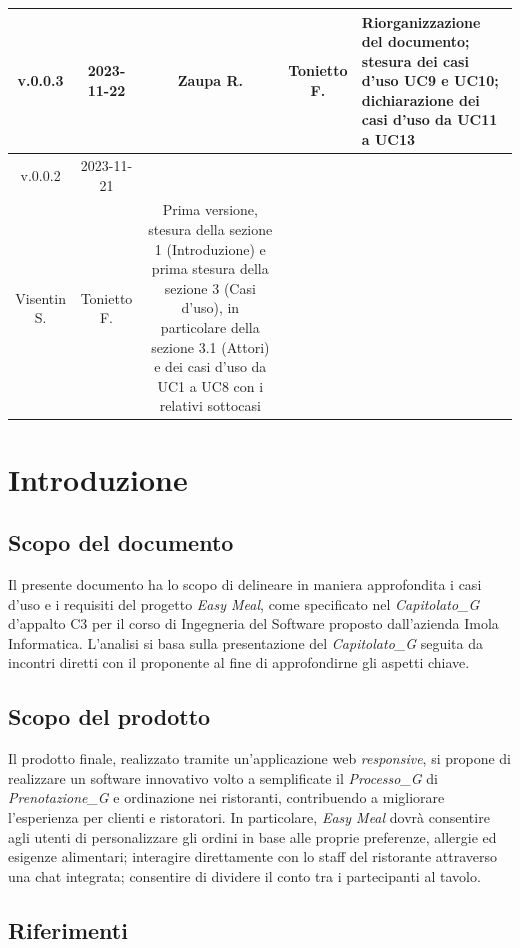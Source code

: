 \documentclass[12pt, oneside]{article}
\begin{document}
\begin{longtable}{|c|c|c|c|p{7cm}|}
\hline
v.0.0.3 & 2023-11-22 & Zaupa R. & Tonietto F. & Riorganizzazione del documento; stesura dei casi d'uso UC9 e UC10; dichiarazione dei casi d'uso da UC11 a UC13 \\
\hline
v.0.0.2 & 2023-11-21 & 
  \begin{tabular}[c]{@{}c@{}}
    Zaupa R. \\
    Visentin S.
  \end{tabular} 
  & Tonietto F. & Prima versione, stesura della sezione 1 (Introduzione) e prima stesura della sezione 3 (Casi d'uso), in particolare della sezione 3.1 (Attori) e dei casi d'uso da UC1 a UC8 con i relativi sottocasi\\
\hline
\end{longtable}
\newpage

\tableofcontents
\newpage

\section{Introduzione}
\subsection{Scopo del documento}
Il presente documento ha lo scopo di delineare in maniera approfondita i casi d'uso e i requisiti del progetto \textit{Easy Meal}, come specificato nel \textit{Capitolato_G} d'appalto C3 per il corso di Ingegneria del Software proposto dall'azienda Imola Informatica.
L'analisi si basa sulla presentazione del \textit{Capitolato_G} seguita da incontri diretti con il proponente al fine di approfondirne gli aspetti chiave.
\subsection{Scopo del prodotto}
Il prodotto finale, realizzato tramite un'applicazione web \emph{responsive}, si propone di realizzare un software innovativo volto a semplificate il \textit{Processo_G} di \textit{Prenotazione_G} e ordinazione nei ristoranti, contribuendo a migliorare l'esperienza per clienti e ristoratori. In particolare, \textit{Easy Meal} dovrà consentire agli utenti di personalizzare gli ordini in base alle proprie preferenze, allergie ed esigenze alimentari; interagire direttamente con lo staff del ristorante attraverso una chat integrata; consentire di dividere il conto tra i partecipanti al tavolo.
\subsection{Riferimenti}
\end{document}

